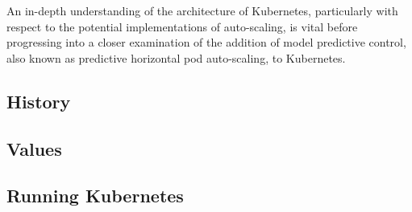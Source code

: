 An in-depth understanding of the architecture of Kubernetes, particularly with
respect to the potential implementations of auto-scaling, is vital before
progressing into a closer examination of the addition of model predictive
control, also known as predictive horizontal pod auto-scaling, to Kubernetes.

\subsection{History}



\subsection{Values}



\subsection{Running Kubernetes}


